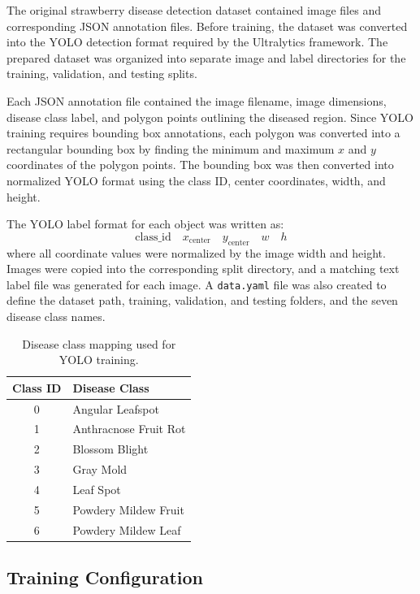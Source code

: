 \documentclass[10pt,twocolumn,letterpaper]{article}
\begin{document}
The original strawberry disease detection dataset contained image files and corresponding JSON annotation files. Before training, the dataset was converted into the YOLO detection format required by the Ultralytics framework. The prepared dataset was organized into separate image and label directories for the training, validation, and testing splits.

Each JSON annotation file contained the image filename, image dimensions, disease class label, and polygon points outlining the diseased region. Since YOLO training requires bounding box annotations, each polygon was converted into a rectangular bounding box by finding the minimum and maximum $x$ and $y$ coordinates of the polygon points. The bounding box was then converted into normalized YOLO format using the class ID, center coordinates, width, and height.

The YOLO label format for each object was written as:
\[
\text{class\_id} \quad x_{\text{center}} \quad y_{\text{center}} \quad w \quad h
\]
where all coordinate values were normalized by the image width and height. Images were copied into the corresponding split directory, and a matching text label file was generated for each image. A \texttt{data.yaml} file was also created to define the dataset path, training, validation, and testing folders, and the seven disease class names.

\begin{table}[!htbp]
  \centering
  \begin{tabular}{@{}cl@{}}
    \toprule
    Class ID & Disease Class \\
    \midrule
    0 & Angular Leafspot \\
    1 & Anthracnose Fruit Rot \\
    2 & Blossom Blight \\
    3 & Gray Mold \\
    4 & Leaf Spot \\
    5 & Powdery Mildew Fruit \\
    6 & Powdery Mildew Leaf \\
    \bottomrule
  \end{tabular}
  \caption{Disease class mapping used for YOLO training.}
  \label{tab:class_mapping}
\end{table}

\subsection{Training Configuration}
\end{document}
